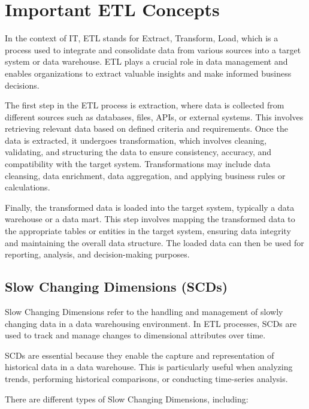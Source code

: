 \chapter{Important ETL Concepts}

In the context of IT, ETL stands for Extract, Transform, Load, which is a process used to integrate and consolidate data from various sources into a target system or data warehouse. ETL plays a crucial role in data management and enables organizations to extract valuable insights and make informed business decisions.

The first step in the ETL process is extraction, where data is collected from different sources such as databases, files, APIs, or external systems. This involves retrieving relevant data based on defined criteria and requirements. Once the data is extracted, it undergoes transformation, which involves cleaning, validating, and structuring the data to ensure consistency, accuracy, and compatibility with the target system. Transformations may include data cleansing, data enrichment, data aggregation, and applying business rules or calculations.

Finally, the transformed data is loaded into the target system, typically a data warehouse or a data mart. This step involves mapping the transformed data to the appropriate tables or entities in the target system, ensuring data integrity and maintaining the overall data structure. The loaded data can then be used for reporting, analysis, and decision-making purposes.

\section{Slow Changing Dimensions (SCDs)}

Slow Changing Dimensions refer to the handling and management of slowly changing data in a data warehousing environment. In ETL processes, SCDs are used to track and manage changes to dimensional attributes over time.

SCDs are essential because they enable the capture and representation of historical data in a data warehouse. This is particularly useful when analyzing trends, performing historical comparisons, or conducting time-series analysis.

There are different types of Slow Changing Dimensions, including:

